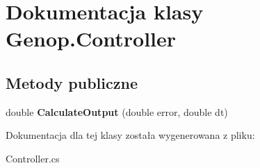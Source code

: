 \hypertarget{classGenop_1_1Controller}{}\section{Dokumentacja klasy Genop.\+Controller}
\label{classGenop_1_1Controller}
\subsection*{Metody publiczne}
\begin{DoxyCompactItemize}
\item 
double {\bfseries Calculate\+Output} (double error, double dt)\hypertarget{classGenop_1_1Controller_ae5fd8ff66bb482c175bd02aa2366a336}{}\label{classGenop_1_1Controller_ae5fd8ff66bb482c175bd02aa2366a336}

\end{DoxyCompactItemize}


Dokumentacja dla tej klasy została wygenerowana z pliku\+:\begin{DoxyCompactItemize}
\item 
Controller.\+cs\end{DoxyCompactItemize}
